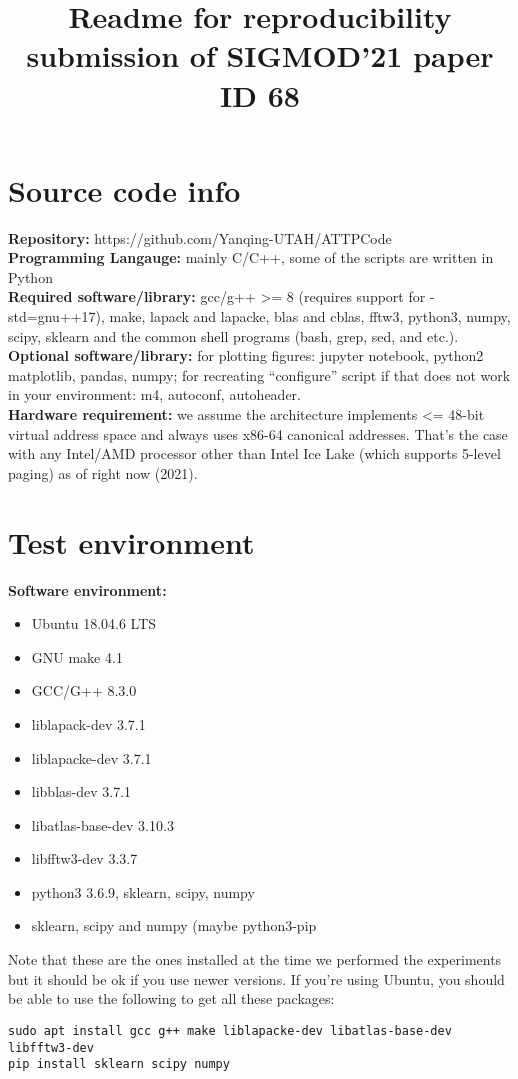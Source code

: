 \documentclass[11pt]{article}
\title{Readme for reproducibility submission of SIGMOD'21 paper ID 68}
\author{}
\date{}
\newenvironment{pkl}{%
\begin{itemize}%
\setlength\itemsep{-0.5\parskip}%
\setlength\parsep{0in}%
}{%
\end{itemize}}
\begin{document}
\maketitle

\section{Source code info}

{\bf Repository:} https://github.com/Yanqing-UTAH/ATTPCode\\
{\bf Programming Langauge:} mainly C/C++, some of the scripts are written in
Python\\
{\bf Required software/library:} gcc/g++ >= 8 (requires support for
-std=gnu++17), make, lapack and lapacke, blas and cblas, fftw3,
python3, numpy, scipy, sklearn and the common shell programs (bash,
grep, sed, and etc.).\\
{\bf Optional software/library:} for plotting figures: jupyter notebook, python2
matplotlib, pandas, numpy; for recreating ``configure'' script if that
does not work in your environment: m4, autoconf, autoheader.  \\
{\bf Hardware requirement:} we assume the architecture implements <= 48-bit
virtual address space and always uses x86-64 canonical addresses.
That's the case with any Intel/AMD processor other than Intel Ice Lake
(which supports 5-level paging) as of right now (2021).

\section{Test environment}
{\bf Software environment:}
\begin{pkl}
	\item Ubuntu 18.04.6 LTS
    \item GNU make 4.1
	\item GCC/G++ 8.3.0
	\item liblapack-dev 3.7.1
	\item liblapacke-dev 3.7.1
	\item libblas-dev 3.7.1
	\item libatlas-base-dev 3.10.3
	\item libfftw3-dev 3.3.7
    \item python3 3.6.9, sklearn, scipy, numpy
    \item sklearn, scipy and numpy (maybe python3-pip
\end{pkl}
Note that these are the ones installed at the
time we performed the experiments but it should be ok if you use newer
versions. If you're using Ubuntu, you should be able to use the
following to get all these packages:
\begin{verbatim}
sudo apt install gcc g++ make liblapacke-dev libatlas-base-dev libfftw3-dev
pip install sklearn scipy numpy
\end{verbatim}
\end{document}
